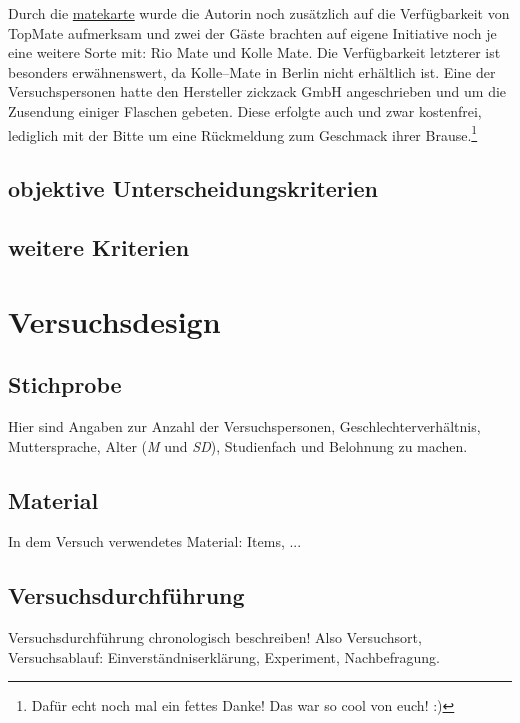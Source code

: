 \documentclass[11pt,a4paper,ngerman]{article}
\begin{document}
Durch die \href{http://www.matekarte.de/}{matekarte} wurde die Autorin noch zusätzlich auf die Verfügbarkeit von TopMate aufmerksam und zwei der Gäste brachten auf eigene Initiative noch je eine weitere Sorte mit: Rio Mate und Kolle Mate. Die Verfügbarkeit letzterer ist besonders erwähnenswert, da Kolle--Mate in Berlin nicht erhältlich ist. Eine der Versuchspersonen hatte den Hersteller zickzack GmbH angeschrieben und um die Zusendung einiger Flaschen gebeten. Diese erfolgte auch und zwar kostenfrei, lediglich mit der Bitte um eine Rückmeldung zum Geschmack ihrer Brause.\footnote{Dafür echt noch mal ein fettes Danke! Das war so cool von euch! :)\footnotemark}

\subsection{objektive Unterscheidungskriterien}


\subsection{weitere Kriterien}

\section{Versuchsdesign}


\subsection{Stichprobe}\label{sec:stichprobe}
Hier sind Angaben zur Anzahl der Versuchspersonen, Geschlechterverhältnis, Muttersprache, Alter (\textit{M} und \textit{SD}), Studienfach und Belohnung zu machen.



\subsection{Material} %
In dem Versuch verwendetes Material: Items, ... 



\subsection{Versuchsdurchführung} %
Versuchsdurchführung chronologisch beschreiben! Also Versuchsort, Versuchsablauf: Einverständniserklärung, Experiment, Nachbefragung.
\end{document}
